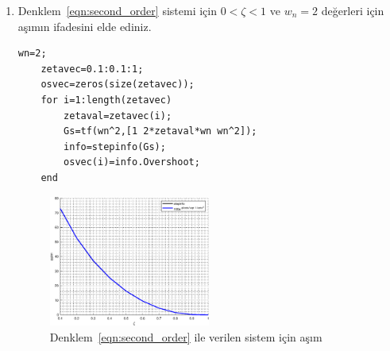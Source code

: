 \begin{enumerate}
\begin{figure}[!htb]
        \label{fig:lec4_plot3}
    \end{figure}
    \item Denklem~\ref{eqn:second_order} sistemi için $0< \zeta<1$ ve $w_n=2$ değerleri için aşımın ifadesini elde ediniz.
    \begin{lstlisting}[style=Matlab-editor]
    wn=2;
    zetavec=0.1:0.1:1;
    osvec=zeros(size(zetavec));
    for i=1:length(zetavec)
        zetaval=zetavec(i);
        Gs=tf(wn^2,[1 2*zetaval*wn wn^2]);
        info=stepinfo(Gs);
        osvec(i)=info.Overshoot;
    end
    \end{lstlisting}
    \begin{figure}[!htb]
        \centering
        \includegraphics[width=0.5\textwidth]{img/lec4_plot4}
        \caption{Denklem~\ref{eqn:second_order} ile verilen sistem için aşım}
        \label{fig:lec4_plot4}
    \end{figure}
\end{enumerate}
